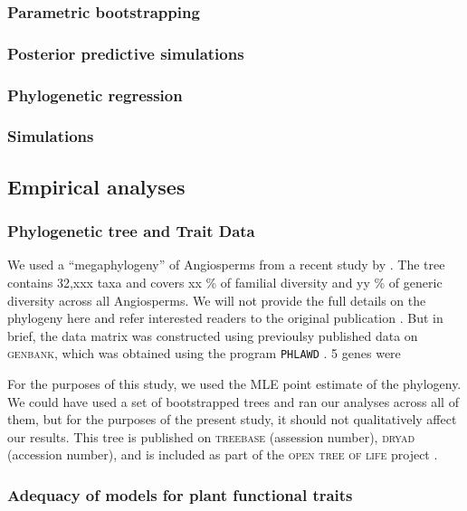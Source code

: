 \documentclass[12pt]{article}
\begin{document}
\subsubsection{Parametric bootstrapping}

\subsubsection{Posterior predictive simulations}

\subsubsection{Phylogenetic regression}

\subsubsection{Simulations}


\subsection{Empirical analyses}

\subsubsection{Phylogenetic tree and Trait Data}

We used a ``megaphylogeny'' of Angiosperms from a recent study by \citet{ZanneBigTree}. The tree contains 32,xxx taxa and covers xx \% of familial diversity and yy \% of generic diversity across all Angiosperms. We will not provide the full details on the phylogeny here and refer interested readers to the original publication \citep{ZanneBigTree}. But in brief, the data matrix was constructed using previoulsy published data on \textsc{genbank}, which was obtained using the program \texttt{PHLAWD} \citep{phlawd}. 5 genes were 

For the purposes of this study, we used the MLE point estimate of the phylogeny. We could have used a set of bootstrapped trees and ran our analyses across all of them, but for the purposes of the present study, it should not qualitatively affect our results. This tree is published on \textsc{treebase} (assession number), \textsc{dryad} (accession number), and is included as part of the \textsc{open tree of life} project \citep{CranstonTOL}.

\subsubsection{Adequacy of models for plant functional traits}
\end{document}

